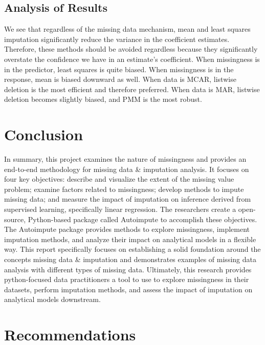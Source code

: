 \documentclass[12pt,oneside]{chicagocapstone}
\begin{document}
\section*{Analysis of Results}\label{analysis-of-results}

We see that regardless of the missing data mechanism, mean and least
squares imputation significantly reduce the variance in the coefficient
estimates. Therefore, these methods should be avoided regardless because
they significantly overstate the confidence we have in an estimate's
coefficient. When missingness is in the predictor, least squares is
quite biased. When missingness is in the response, mean is biased
downward as well. When data is MCAR, listwise deletion is the most
efficient and therefore preferred. When data is MAR, listwise deletion
becomes slightly biased, and PMM is the most robust.

\chapter*{Conclusion}\label{conclusion}

In summary, this project examines the nature of missingness and provides
an end-to-end methodology for missing data \& imputation analysis. It
focuses on four key objectives: describe and visualize the extent of the
missing value problem; examine factors related to missingness; develop
methods to impute missing data; and measure the impact of imputation on
inference derived from supervised learning, specifically linear
regression. The researchers create a open-source, Python-based package
called Autoimpute to accomplish these objectives. The Autoimpute package
provides methods to explore missingness, implement imputation methods,
and analyze their impact on analytical models in a flexible way. This
report specifically focuses on establishing a solid foundation around
the concepts missing data \& imputation and demonstrates examples of
missing data analysis with different types of missing data. Ultimately,
this research provides python-focused data practitioners a tool to use
to explore missingness in their datasets, perform imputation methods,
and assess the impact of imputation on analytical models downstream.

\chapter*{Recommendations}\label{recommendations}
\end{document}

